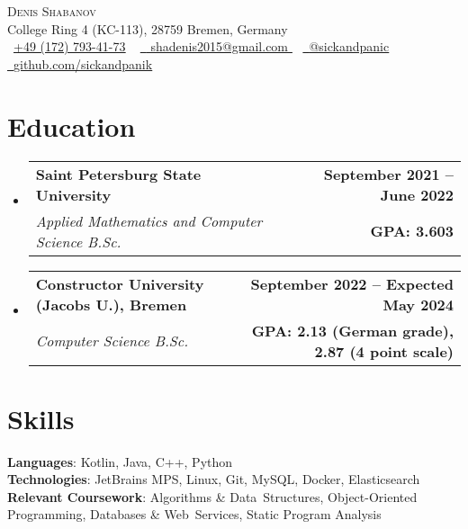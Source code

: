 \documentclass[a4,12pt]{article}
\makeatletter
\newcommand{\resumeSubheading}[4]{
  \vspace{-2pt}\item
    \begin{tabular*}{1.0\textwidth}[t]{l@{\extracolsep{\fill}}r}
      \textbf{#1} & \textbf{\small #2} \\
      \textit{\small#3} & \textbf{\small #4} \\
    \end{tabular*}\vspace{-7pt}
}
\newcommand{\resumeSubHeadingListStart}{\begin{itemize}[leftmargin=0.0in, label={}]}
\newcommand{\resumeSubHeadingListEnd}{\end{itemize}}
\makeatother
\begin{document}

\begin{center}
    {\Huge \scshape Denis Shabanov} \\ \vspace{1pt}
    College Ring 4 (KC-113), 28759 Bremen, Germany \\ \vspace{1pt}
    \small \raisebox{-0.1\height}\faPhone\
    \href{tel:+491727934173}{\underline{+49 (172) 793-41-73}} ~
    \href{
    mailto:shadenis2015@gmail.com
    }{\raisebox{-0.2\height}\faEnvelope\  \underline{
    shadenis2015@gmail.com
    }} ~ 
    \href{https://t.me/sickandpanic}{\raisebox{-0.2\height}\faSend\ \underline{@sickandpanic}}  ~
    \href{https://github.com/sickandpanik}{\raisebox{-0.2\height}\faGithub\ \underline{github.com/sickandpanik}}
    \vspace{-8pt}
\end{center}


\section{Education}
  \resumeSubHeadingListStart
    \resumeSubheading
      {Saint Petersburg State University}{September 2021 -- June 2022}
      {Applied Mathematics and Computer Science B.Sc.}{GPA: 3.603}
    \resumeSubheading
      {Constructor University (Jacobs U.), Bremen}{September 2022 -- Expected May 2024}
      {Computer Science B.Sc.}{GPA: 2.13 (German grade), 2.87 (4 point scale)}
  \resumeSubHeadingListEnd
  

\section{Skills}
 \begin{itemize}[leftmargin=0.15in, label={}]
    \small{\item{
     \textbf{Languages}{: Kotlin, Java, C++, Python} \\
     \textbf{Technologies}{: JetBrains MPS, Linux, Git, MySQL, Docker, Elasticsearch} \\
     \textbf{Relevant Coursework}{: Algorithms \& Data~Structures, Object-Oriented Programming, Databases \& Web~Services, Static Program Analysis} \\
     }}
 \end{itemize}
 \vspace{-16pt}
\end{document}
